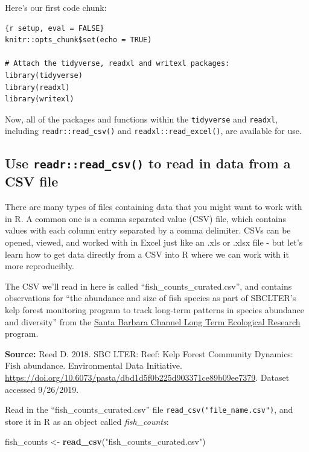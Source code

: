 \documentclass[]{book}
\newenvironment{Shaded}{\begin{snugshade}}{\end{snugshade}}
\newcommand{\KeywordTok}[1]{\textcolor[rgb]{0.13,0.29,0.53}{\textbf{#1}}}
\newcommand{\NormalTok}[1]{#1}
\newcommand{\StringTok}[1]{\textcolor[rgb]{0.31,0.60,0.02}{#1}}
\begin{document}
Here's our first code chunk:

\begin{verbatim}
{r setup, eval = FALSE}
knitr::opts_chunk$set(echo = TRUE)

# Attach the tidyverse, readxl and writexl packages:
library(tidyverse)
library(readxl)
library(writexl)
\end{verbatim}

Now, all of the packages and functions within the \texttt{tidyverse} and \texttt{readxl}, including \texttt{readr::read\_csv()} and \texttt{readxl::read\_excel()}, are available for use.

\hypertarget{use-readrread_csv-to-read-in-data-from-a-csv-file}{%
\subsection{\texorpdfstring{Use \texttt{readr::read\_csv()} to read in data from a CSV file}{Use readr::read\_csv() to read in data from a CSV file}}\label{use-readrread_csv-to-read-in-data-from-a-csv-file}}

There are many types of files containing data that you might want to work with in R. A common one is a comma separated value (CSV) file, which contains values with each column entry separated by a comma delimiter. CSVs can be opened, viewed, and worked with in Excel just like an .xls or .xlsx file - but let's learn how to get data directly from a CSV into R where we can work with it more reproducibly.

The CSV we'll read in here is called ``fish\_counts\_curated.csv'', and contains observations for ``the abundance and size of fish species as part of SBCLTER's kelp forest monitoring program to track long-term patterns in species abundance and diversity'' from the \href{http://sbc.lternet.edu/}{Santa Barbara Channel Long Term Ecological Research} program.

\textbf{Source:} Reed D. 2018. SBC LTER: Reef: Kelp Forest Community Dynamics: Fish abundance. Environmental Data Initiative. \url{https://doi.org/10.6073/pasta/dbd1d5f0b225d903371ce89b09ee7379}. Dataset accessed 9/26/2019.

Read in the ``fish\_counts\_curated.csv'' file \texttt{read\_csv("file\_name.csv")}, and store it in R as an object called \emph{fish\_counts}:

\begin{Shaded}
\begin{Highlighting}[]
\NormalTok{fish_counts <-}\StringTok{ }\KeywordTok{read_csv}\NormalTok{(}\StringTok{"fish_counts_curated.csv"}\NormalTok{)}
\end{Highlighting}
\end{Shaded}
\end{document}
